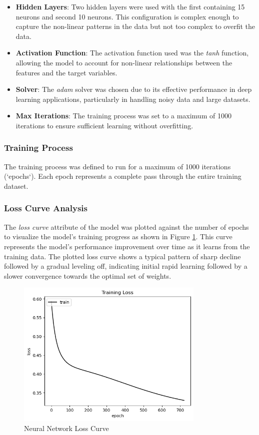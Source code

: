 \begin{itemize}
    \item \textbf{Hidden Layers}: Two hidden layers were used with the first containing 15 neurons and second 10 neurons. This configuration is complex enough to capture the non-linear patterns in the data but
          not too complex to overfit the data.
    \item \textbf{Activation Function}: The activation function used was the \textit{tanh} function, allowing the model to account for non-linear relationships between the features and the target variables.
    \item \textbf{Solver}: The \textit{adam} solver was chosen due to its effective performance in deep learning applications, particularly in handling noisy data and large datasets.
    \item \textbf{Max Iterations}: The training process was set to a maximum of 1000 iterations to ensure sufficient learning without overfitting.
\end{itemize}

\subsubsection*{Training Process} The training process was defined to run for a maximum of 1000 iterations (`epochs`). Each epoch represents a complete pass through the entire training dataset.

\subsubsection*{Loss Curve Analysis} The \textit{loss curve} attribute of the model was plotted against the number of epochs to visualize the model's training progress as shown in Figure
\ref{fig:neural_network_loss_curve}. This curve represents the model's performance improvement over time as it learns from the training data. The plotted loss curve shows a typical pattern
of sharp decline followed by a gradual leveling off, indicating initial rapid learning followed by a slower convergence towards the optimal set of weights.

\begin{figure}[H]
    \centering
    \includegraphics[width=0.8\textwidth]{images/nnCharts/neural_network_loss_curve.png}
    \caption{Neural Network Loss Curve}
    \label{fig:neural_network_loss_curve}
\end{figure}

